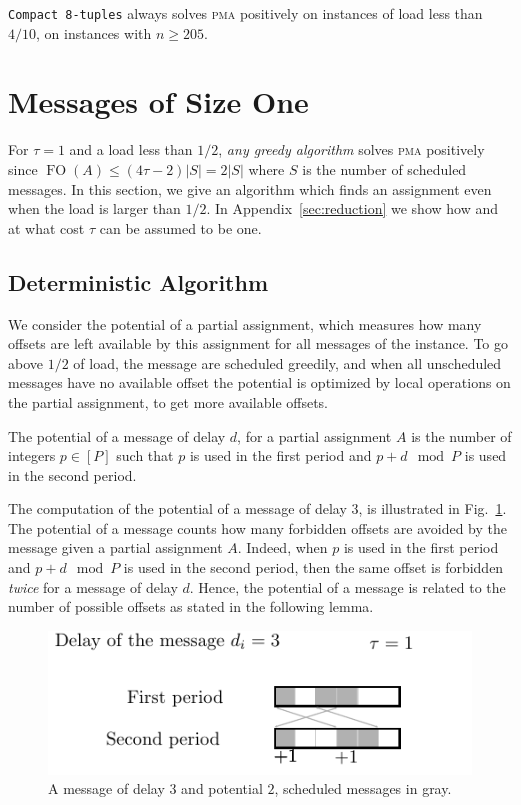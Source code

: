 \documentclass[a4paper,UKenglish,cleveref, autoref, thm-restate]{lipics-v2019}
\DeclareMathOperator{\Fo}{FO}
\newcommand\pma{\textsc{pma}\xspace}
\begin{document}
\begin{theorem}\label{th:k-tuples}
\texttt{Compact 8-tuples} always solves \pma positively on instances of load less than $4/10$, on instances with $n \geq 205$.
\end{theorem}


\section{Messages of Size One} \label{sec:small}

For $\tau = 1$ and a load less than $1/2$, \emph{any greedy algorithm} solves \pma positively since $\Fo(A) \leq (4\tau -2)|S| = 2|S|$ where $S$ is the number of scheduled messages. In this section, we give an algorithm which finds an assignment even when the load is larger than $1/2$. In Appendix~\ref{sec:reduction} we show how and at what cost $\tau$ can be assumed to be one.

\subsection{Deterministic Algorithm}

We consider the potential of a partial assignment, which measures how many offsets are left available by this assignment for 
all messages of the instance. To go above $1/2$ of load, the message are scheduled greedily, and when all unscheduled messages have no available offset
the potential is optimized by local operations on the partial assignment, to get more available offsets. 
 
\begin{definition}
The potential of a message of delay $d$, for a partial assignment $A$
is the number of integers $p \in [P]$ such that $p$ is used in the first period and $p+d \mod P$ is used in the second period.
\end{definition}

The computation of the potential of a message of delay $3$, is illustrated in Fig.~\ref{fig:messagepotential}.
The potential of a message counts how many forbidden offsets are avoided by the message given a partial assignment $A$.
Indeed, when $p$ is used in the first period and $p+d \mod P$ is used in the second period,
then the same offset is forbidden \emph{twice} for a message of delay $d$. Hence, the potential of a message is related to the number of possible offsets as stated in the following lemma. 
\begin{figure}
\begin{center}
\includegraphics[scale=1]{messagepotential}
\end{center}
\caption{A message of delay $3$ and potential $2$, scheduled messages in gray.}
\label{fig:messagepotential}
\end{figure}
\end{document}
